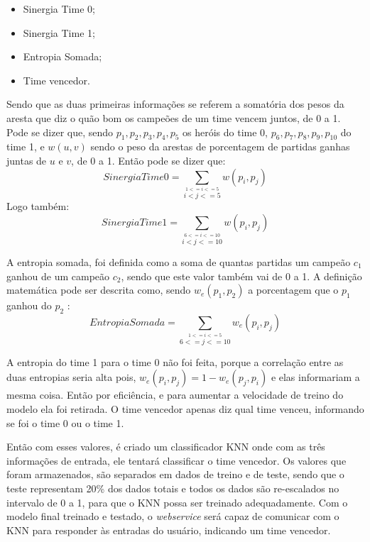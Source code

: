 \begin{itemize}
	\item Sinergia Time 0;
	\item Sinergia Time 1;
	\item Entropia Somada;
	\item Time vencedor.
\end{itemize}

Sendo que as duas primeiras informações se referem a somatória dos pesos da aresta que diz o quão bom os campeões de um time vencem juntos, de 0 a 1. Pode se dizer que, sendo \( p_1, p_2, p_3, p_4, p_5 \) os heróis do time 0, \( p_6, p_7, p_8, p_9, p_10 \) do time 1, e \(w(u,v)\) sendo o peso da arestas de porcentagem de partidas ganhas juntas de \(u\) e \(v\), de 0 a 1. Então pode se dizer que: \[ Sinergia Time 0 = \sum_{\overset{1<=i<=5}{i<j<=5}}w(p_i,p_j)\] Logo também: \[ Sinergia Time 1 = \sum_{\overset{6<=i<=10}{i<j<=10}}w(p_i,p_j)\]

A entropia somada, foi definida como a soma de quantas partidas um campeão \(c_1\) ganhou de um campeão \(c_2\), sendo que este valor também vai de 0 a 1. A definição matemática pode ser descrita como, sendo \(w_e(p_1,p_2)\) a porcentagem que o \(p_1\) ganhou do \(p_2\) : \[ Entropia Somada = \sum_{\overset{1<=i<=5}{6<=j<=10}}w_e(p_i,p_j)\]

A entropia do time 1 para o time 0 não foi feita, porque a correlação entre as duas entropias seria alta pois, \(w_e(p_i, p_j) = 1 - w_e(p_j, p_i)\) e elas informariam a mesma coisa. Então por eficiência, e para aumentar a velocidade de treino do modelo ela foi retirada. O time vencedor apenas diz qual time venceu, informando se foi o time 0 ou o time 1.

Então com esses valores, é criado um classificador KNN onde com as três informações de entrada, ele tentará classificar o time vencedor. Os valores que foram armazenados, são separados em dados de treino e de teste, sendo que o teste representam 20\% dos dados totais e todos os dados são re-escalados no intervalo de 0 a 1, para que o KNN possa ser treinado adequadamente.
Com o modelo final treinado e testado, o \textit{webservice} será capaz de comunicar com o KNN para responder às entradas do usuário, indicando um time vencedor.
\